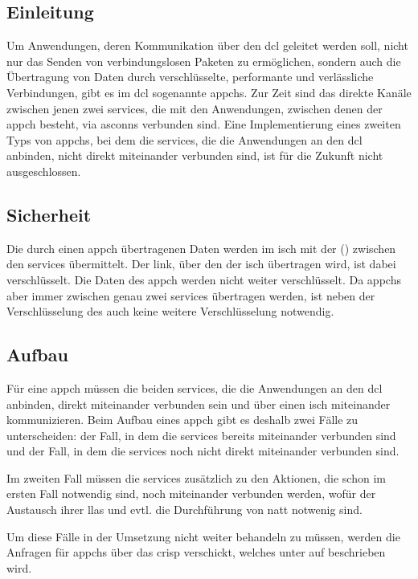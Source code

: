 
\subsection{Einleitung}
Um Anwendungen, deren Kommunikation über den \gls{dcl} geleitet werden soll,
nicht nur das Senden von verbindungslosen Paketen zu ermöglichen, sondern auch
die Übertragung von Daten durch verschlüsselte, performante und verlässliche
Verbindungen, gibt es im \gls{dcl} sogenannte \glspl{appch}.
Zur Zeit sind das direkte Kanäle zwischen jenen zwei \glspl{service}, die mit
den Anwendungen, zwischen denen der \gls{appch} besteht, via \glspl{asconn}
verbunden sind.
Eine Implementierung eines zweiten Typs von \glspl{appch}, bei dem die
\glspl{service}, die die Anwendungen an den \gls{dcl} anbinden, nicht direkt
miteinander verbunden sind, ist für die Zukunft nicht ausgeschlossen.

\subsection{Sicherheit}
Die durch einen \gls{appch} übertragenen Daten werden im \gls{isch} mit der
\msg{\isprotoacd} () zwischen den \glspl{service}
übermittelt.
Der \gls{link}, über den der \gls{isch} übertragen wird, ist dabei
verschlüsselt.
Die Daten des \gls{appch} werden nicht weiter verschlüsselt.
Da \glspl{appch} aber immer zwischen genau zwei \glspl{service} übertragen
werden, ist neben der Verschlüsselung des  auch keine
weitere Verschlüsselung notwendig.

\subsection{Aufbau}
Für eine \gls{appch} müssen die beiden \glspl{service}, die die Anwendungen an
den \gls{dcl} anbinden, direkt miteinander verbunden sein und über einen
\gls{isch} miteinander kommunizieren.
Beim Aufbau eines \gls{appch} gibt es deshalb zwei Fälle zu unterscheiden:
der Fall, in dem die \glspl{service} bereits miteinander verbunden sind und der
Fall, in dem die \glspl{service} noch nicht direkt miteinander verbunden sind.

Im zweiten Fall müssen die \glspl{service} zusätzlich zu den Aktionen, die
schon im ersten Fall notwendig sind, noch miteinander verbunden werden, wofür
der Austausch ihrer \glspl{lla} und evtl. die Durchführung von \gls{natt}
notwenig sind.

Um diese Fälle in der Umsetzung nicht weiter behandeln zu müssen, werden die
Anfragen für \glspl{appch} über das \acrfull{crisp} verschickt, welches unter
 auf  beschrieben wird.

